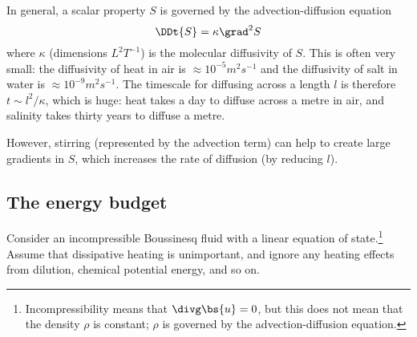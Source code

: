 In general, a scalar property $S$ is governed by the advection-diffusion equation
\begin{equation}
    \DDt{S} = \kappa\grad^2S
\end{equation}
where $\kappa$ (dimensions $L^2T^{-1}$) is the molecular diffusivity of $S$.
This is often very small: the diffusivity of heat in air is
$\approx10^{-5}m^2s^{-1}$ and the diffusivity of salt in water is
$\approx10^{-9}m^2s^{-1}$. The timescale for diffusing across a length $l$ is
therefore $t\sim l^2/\kappa$, which is huge: heat takes a day to diffuse across
a metre in air, and salinity takes thirty years to diffuse a metre.

However, stirring (represented by the advection term) can help to create large
gradients in $S$, which increases the rate of diffusion (by reducing $l$).

\subsection{The energy budget}

Consider an incompressible Boussinesq fluid with a linear equation of
state.\footnote{Incompressibility means that $\divg\bs{u}=0$, but this does not
mean that the density $\rho$ is constant; $\rho$ is governed by the
advection-diffusion equation.}
Assume that dissipative heating is unimportant, and ignore any heating effects
from dilution, chemical potential energy, and so on. 

